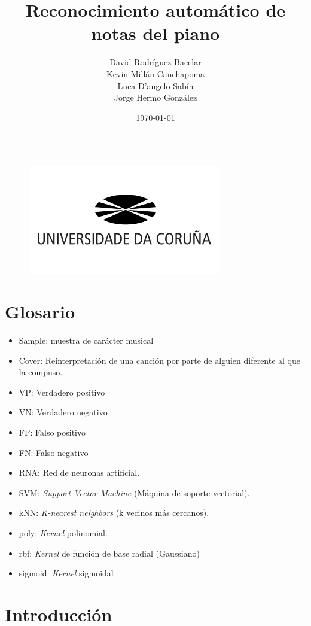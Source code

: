 \documentclass[12pt]{article}
\title{\textbf{\huge Reconocimiento automático de notas del piano}}
\author{{David Rodríguez Bacelar} \\[0.25cm] {Kevin Millán Canchapoma} \\[0.25cm]{Luca D'angelo Sabín} \\[0.25cm]{Jorge Hermo González}}
\date{\today}
\newcommand{\HRule}{\rule{\linewidth}{0.5mm}}
\begin{document}
\maketitle
\HRule
\bigskip\bigskip\bigskip\bigskip\bigskip\bigskip
\begin{figure}[!ht]
	\centering
	\includegraphics[height=180px]{assets/udc.jpg}
	\label{fig:diagram1}
\end{figure}

\newpage

\tableofcontents

\newpage
\section{Glosario}
\label{Glosario}
\begin{itemize}
	\item Sample: muestra de carácter musical
	\item Cover: Reinterpretación de una canción por parte de alguien diferente al que la compuso.
	\item VP: Verdadero positivo
	\item VN: Verdadero negativo
	\item FP: Falso positivo
	\item FN: Falso negativo
	\item RNA: Red de neuronas artificial.
	\item SVM: \textit{Support Vector Machine} (Máquina de soporte vectorial).
	\item kNN: \textit{K-nearest neighbors} (k vecinos más cercanos).
	\item poly: \textit{Kernel} polinomial.
	\item rbf: \textit{Kernel} de función de base radial (Gaussiano)
	\item sigmoid: \textit{Kernel} sigmoidal
\end{itemize}

\section{Introducción}
\end{document}
